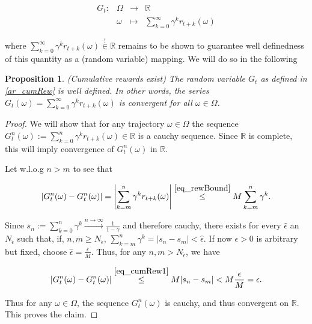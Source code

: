 \documentclass[11pt]{article} %
\newtheorem{prop}{Proposition}
\begin{document}
\begin{equation}
	\begin{array}{rlll}\label{ar_cumRew}
		G_t: 	& \Omega 		& \rightarrow 	& \mathbb{R} \\
			&	\omega	& \mapsto 	& \sum_{k=0}^{\infty} \gamma^k r_{t+k}(\omega)
	\end{array}
\end{equation}

where $\sum_{k=0}^{\infty} \gamma^k r_{t+k}(\omega) \overset{!}{\in} \mathbb{R}$ remains to be shown to guarantee well definedness of this quantity as a (random variable) mapping. We will do so in the following

\begin{prop}\label{prop_cumRewEx}{(Cumulative rewards exist)}
	The random variable $G_t$ as defined in \ref{ar_cumRew} is well defined. In other words, the series $G_t(\omega) = \sum_{k=0}^{\infty} \gamma^k r_{t+k}(\omega)$ is convergent for all $\omega \in \Omega$.
\end{prop}

\begin{proof}
We will show that for any trajectory $\omega \in \Omega$ the sequence $G_t^n(\omega) := \sum_{k=0}^{n} \gamma^k r_{t+k}(\omega) \in \mathbb{R}$ is a cauchy sequence. Since $\mathbb{R}$ is complete, this will imply convergence of $G_t^n(\omega)$ in $\mathbb{R}$.

Let w.l.o.g $n > m$ to see that

	\begin{equation}\label{eq_cumRew1}
		\left| G_t^n(\omega) - G_t^n(\omega)\right| = \left| \sum_{k=m}^n \gamma^k r_{t+k}(\omega) \right| \overset{\ref{eq_rewBound}}{\le} M \sum_{k=m}^n \gamma^k.
	\end{equation}

Since $s_n := \sum_{k=0}^n \gamma^k \overset{n \rightarrow \infty}{\rightarrow} \frac{1}{1-\gamma}$ and therefore cauchy, there exists for every $\hat{\epsilon}$ an $N_{\hat{\epsilon}}$ such that, if, $n,m \ge N_{\hat{\epsilon}}$, $\sum_{k=m}^n \gamma^k = |s_n - s_m| < \hat{\epsilon}$. If now $\epsilon >0$ is arbitrary but fixed, choose $\hat{\epsilon} = \frac{\epsilon}{M}$. Thus, for any $n,m > N_{\hat{\epsilon}}$, we have

\begin{equation}\label{eq_cumRew2}
	\left|G_t^n(\omega) - G_t^n(\omega)\right| \overset{\ref{eq_cumRew1}}{\le} M |s_n - s_m| < M \frac{\epsilon}{M} = \epsilon.
\end{equation}

Thus for any $\omega \in \Omega$, the sequence $G_t^n(\omega)$ is cauchy, and thus convergent on $\mathbb{R}$. This proves the claim.

\end{proof}
\end{document}
